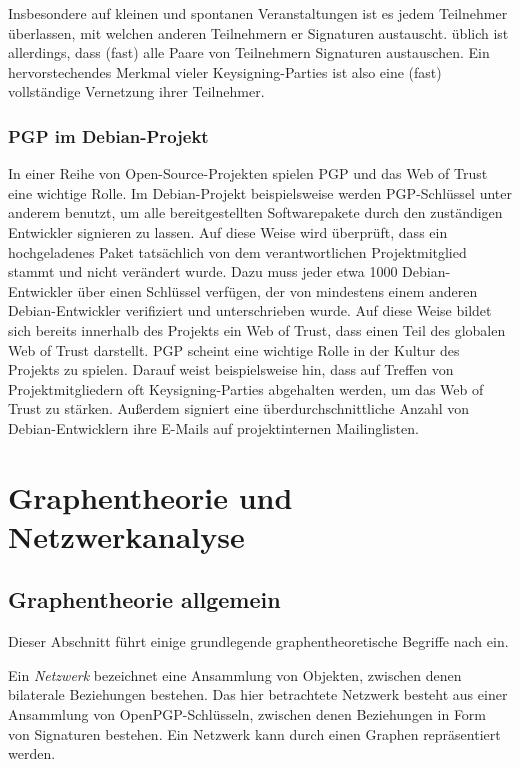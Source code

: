 Insbesondere auf kleinen und spontanen Veranstaltungen ist es jedem
Teilnehmer überlassen, mit welchen anderen Teilnehmern er Signaturen
austauscht. üblich ist allerdings, dass (fast) alle Paare von
Teilnehmern Signaturen austauschen. Ein hervorstechendes Merkmal
vieler Keysigning-Parties ist also eine (fast) vollständige
Vernetzung ihrer Teilnehmer.

\subsubsection{PGP im Debian-Projekt}
\label{sec:foobar-fixme}

In einer Reihe von Open-Source-Projekten spielen PGP und das Web of
Trust eine wichtige Rolle. Im Debian-Projekt beispielsweise werden
PGP-Schlüssel unter anderem benutzt, um alle bereitgestellten
Softwarepakete durch den zuständigen Entwickler signieren zu
lassen. Auf diese Weise wird überprüft, dass ein hochgeladenes
Paket tatsächlich von dem verantwortlichen Projektmitglied stammt
und nicht verändert wurde. Dazu muss jeder etwa 1000
Debian-Entwickler über einen Schlüssel verfügen, der von
mindestens einem anderen Debian-Entwickler verifiziert und
unterschrieben wurde. Auf diese Weise bildet sich bereits innerhalb
des Projekts ein Web of Trust, dass einen Teil des globalen Web of
Trust darstellt. PGP scheint eine wichtige Rolle in der Kultur des
Projekts zu spielen. Darauf weist beispielsweise hin, dass auf Treffen
von Projektmitgliedern oft Keysigning-Parties abgehalten werden, um
das Web of Trust zu stärken. Außerdem signiert eine
überdurchschnittliche Anzahl von Debian-Entwicklern ihre E-Mails auf
projektinternen Mailinglisten.

\section{Graphentheorie und Netzwerkanalyse}
\label{sec:graph-und-netzw}

\subsection{Graphentheorie allgemein}
\label{ch:Grundlagen:sec:Graphentheorie}

Dieser Abschnitt führt einige grundlegende graphentheoretische
Begriffe nach \cite{Brandes2004} ein.
  
Ein \emph{Netzwerk} bezeichnet eine Ansammlung von Objekten, zwischen
denen bilaterale Beziehungen bestehen. Das hier betrachtete Netzwerk
besteht aus einer Ansammlung von OpenPGP-Schlüsseln, zwischen denen
Beziehungen in Form von Signaturen bestehen. Ein Netzwerk kann durch einen
Graphen repräsentiert werden.

